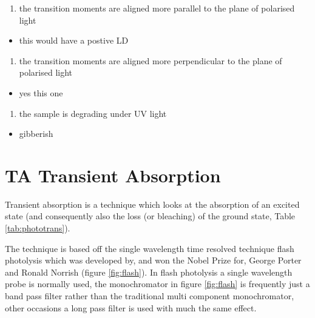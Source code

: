 \documentclass[
]{book}
\providecommand{\tightlist}{%
  \setlength{\itemsep}{0pt}\setlength{\parskip}{0pt}}
\begin{document}
\begin{enumerate}
\def\labelenumi{\alph{enumi}.}
\setcounter{enumi}{4}
\tightlist
\item
  the transition moments are aligned more parallel to the plane of polarised light
\end{enumerate}

\begin{itemize}
\tightlist
\item
  this would have a postive LD
\end{itemize}

\begin{enumerate}
\def\labelenumi{\alph{enumi}.}
\setcounter{enumi}{5}
\tightlist
\item
  the transition moments are aligned more perpendicular to the plane of polarised light
\end{enumerate}

\begin{itemize}
\tightlist
\item
  yes this one
\end{itemize}

\begin{enumerate}
\def\labelenumi{\alph{enumi}.}
\setcounter{enumi}{6}
\tightlist
\item
  the sample is degrading under UV light
\end{enumerate}

\begin{itemize}
\tightlist
\item
  gibberish
\end{itemize}

\hypertarget{ch:TA}{%
\chapter{TA Transient Absorption}\label{ch:TA}}

Transient absorption is a technique which looks at the absorption of an excited state (and consequently also the loss (or bleaching) of the ground state, Table \ref{tab:phototrans}).

The technique is based off the single wavelength time resolved technique flash photolysis which was developed by, and won the Nobel Prize for, George Porter and Ronald Norrish (figure \ref{fig:flash}). In flash photolysis a single wavelength probe is normally used, the monochromator in figure \ref{fig:flash} is frequently just a band pass filter rather than the traditional multi component monochromator, other occasions a long pass filter is used with much the same effect.
\end{document}
